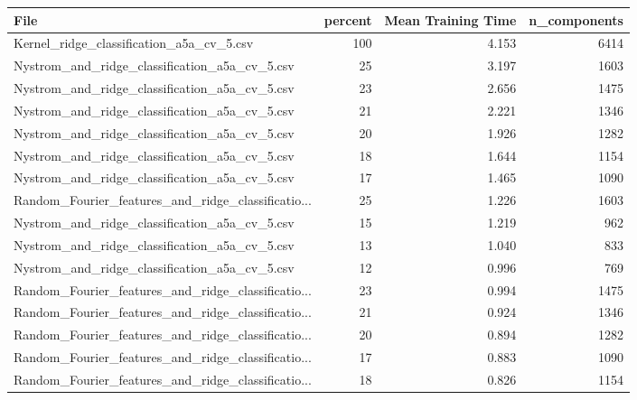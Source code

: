 \begin{tabularx}{\textwidth}{lrrr}
\toprule
                                              File &  percent &  Mean Training Time &  n\_components \\
\midrule
          Kernel\_ridge\_classification\_a5a\_cv\_5.csv &      100 &               4.153 &          6414 \\
     Nystrom\_and\_ridge\_classification\_a5a\_cv\_5.csv &       25 &               3.197 &          1603 \\
     Nystrom\_and\_ridge\_classification\_a5a\_cv\_5.csv &       23 &               2.656 &          1475 \\
     Nystrom\_and\_ridge\_classification\_a5a\_cv\_5.csv &       21 &               2.221 &          1346 \\
     Nystrom\_and\_ridge\_classification\_a5a\_cv\_5.csv &       20 &               1.926 &          1282 \\
     Nystrom\_and\_ridge\_classification\_a5a\_cv\_5.csv &       18 &               1.644 &          1154 \\
     Nystrom\_and\_ridge\_classification\_a5a\_cv\_5.csv &       17 &               1.465 &          1090 \\
Random\_Fourier\_features\_and\_ridge\_classificatio... &       25 &               1.226 &          1603 \\
     Nystrom\_and\_ridge\_classification\_a5a\_cv\_5.csv &       15 &               1.219 &           962 \\
     Nystrom\_and\_ridge\_classification\_a5a\_cv\_5.csv &       13 &               1.040 &           833 \\
     Nystrom\_and\_ridge\_classification\_a5a\_cv\_5.csv &       12 &               0.996 &           769 \\
Random\_Fourier\_features\_and\_ridge\_classificatio... &       23 &               0.994 &          1475 \\
Random\_Fourier\_features\_and\_ridge\_classificatio... &       21 &               0.924 &          1346 \\
Random\_Fourier\_features\_and\_ridge\_classificatio... &       20 &               0.894 &          1282 \\
Random\_Fourier\_features\_and\_ridge\_classificatio... &       17 &               0.883 &          1090 \\
Random\_Fourier\_features\_and\_ridge\_classificatio... &       18 &               0.826 &          1154 \\

\end{tabularx}
